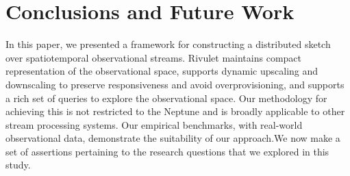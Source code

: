\section{Conclusions and Future Work}
\label{sec:conclusions}
In this paper, we presented a framework for constructing a distributed sketch over spatiotemporal observational streams. Rivulet maintains compact representation of the observational space, supports dynamic upscaling and downscaling to preserve responsiveness and avoid overprovisioning, and supports a rich set of queries to explore the observational space. Our methodology for achieving this is not restricted to the Neptune and is broadly applicable to other stream processing systems.  Our empirical benchmarks, with real-world observational data, demonstrate the suitability of our approach.We now make a set of assertions pertaining to the research questions that we explored in this study.
